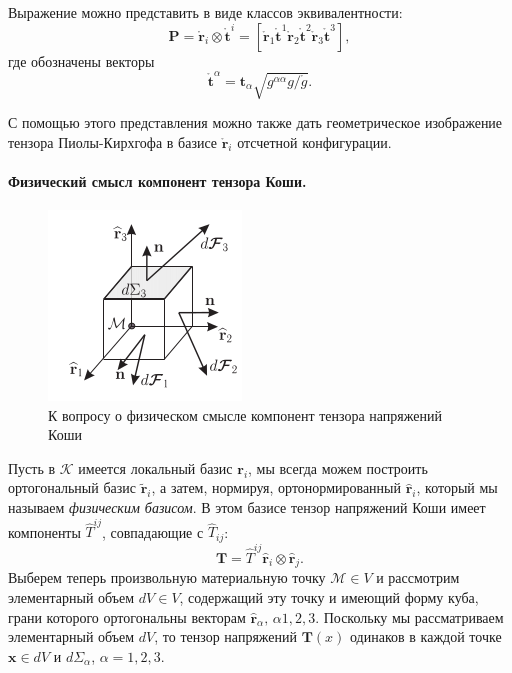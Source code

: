 Выражение можно представить в виде классов эквивалентности:
\begin{equation*}
	\mathbf{P} = \mathring{\mathbf{r}}_i \otimes \mathring{\mathbf{t}}^i = \left[\mathring{\mathbf{r}}_1 \mathring{\mathbf{t}}^1 \mathring{\mathbf{r}}_2 \mathring{\mathbf{t}}^2 \mathring{\mathbf{r}}_3 \mathring{\mathbf{t}}^3\right], 
\end{equation*}
где обозначены векторы
\begin{equation*}
	\mathring{\mathbf{t}}^{\alpha} = \mathbf{t}_{\alpha} \sqrt{g^{\alpha \alpha} g / \mathring{g}}.
\end{equation*}

С помощью этого представления можно также дать геометрическое изображение тензора Пиолы-Кирхгофа в базисе $\mathring{\mathbf{r}}_i$ отсчетной конфигурации.

\paragraph{Физический смысл компонент тензора Коши.}


\begin{figure}[H]
	\centering
	\includegraphics[width=0.4\linewidth]{img/que18_2}
	\caption{К вопросу о физическом смысле компонент тензора напряжений Коши}
	\label{fig:que18_2}
\end{figure}

Пусть в $\mathcal{K}$ имеется локальный базис $\mathbf{r}_i$, мы всегда можем построить ортогональный базис $\widetilde{\mathbf{r}}_i$, а затем, нормируя, ортонормированный $\widehat{\mathbf{r}}_i$, который мы называем \textit{физическим базисом}. В этом базисе тензор напряжений Коши имеет компоненты $\widehat{T}^{ij}$, совпадающие с $\widehat{T}_{ij}$: 
\begin{equation*}
	\mathbf{T} = \widehat{T}^{i j} \widehat{\mathbf{r}}_i \otimes \widehat{\mathbf{r}}_j.
\end{equation*}
Выберем теперь произвольную материальную точку $\mathcal{M} \in V$ и рассмотрим элементарный объем $dV \in V$, содержащий эту точку и имеющий форму куба, грани которого ортогональны векторам $\widehat{\mathbf{r}}_{\alpha}, \, \alpha 1, 2, 3$. Поскольку мы рассматриваем элементарный объем $dV$, то тензор напряжений $\mathbf{T}(x)$ одинаков в каждой точке $\mathbf{x} \in dV$ и $d\Sigma_{\alpha}$, $\alpha = 1, 2, 3$. 

